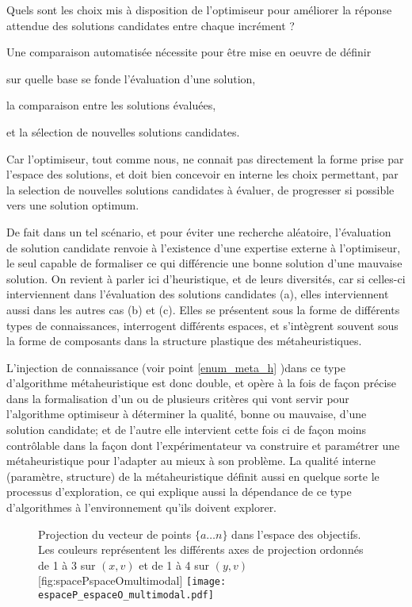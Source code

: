 Quels sont les choix mis à disposition de l'optimiseur pour améliorer la réponse attendue des solutions candidates entre chaque incrément ? \autocite[19]{Weise2011}

Une comparaison automatisée nécessite pour être mise en oeuvre de définir \begin{enumerate*}[label=(\alph*)]
\item sur quelle base se fonde l'évaluation d'une solution,
\item la comparaison entre les solutions évaluées,
\item et la sélection de nouvelles solutions candidates.\end{enumerate*} Car l'optimiseur, tout comme nous, ne connait pas directement la forme prise par l'espace des solutions, et doit bien concevoir en interne les choix permettant, par la selection de nouvelles solutions candidates à évaluer, de progresser si possible vers une solution optimum.

De fait dans un tel scénario, et pour éviter une recherche aléatoire, l'évaluation de solution candidate renvoie à l'existence d'une expertise externe à l'optimiseur, le seul capable de formaliser ce qui différencie une bonne solution d'une mauvaise solution. On revient à parler ici d'heuristique, et de leurs diversités, car si celles-ci interviennent dans l'évaluation des solutions candidates (a), elles interviennent aussi dans les autres cas (b) et (c). Elles se présentent sous la forme de différents types de connaissances, interrogent différents espaces, et s'intègrent souvent sous la forme de composants dans la structure plastique des métaheuristiques.

L'injection de connaissance (voir point \ref{enum_meta_h} )dans ce type d'algorithme métaheuristique est donc double, et opère à la fois de façon précise dans la formalisation d'un ou de plusieurs critères qui vont servir pour l'algorithme optimiseur à déterminer la qualité, bonne ou mauvaise, d'une solution candidate; et de l'autre elle intervient cette fois ci de façon moins contrôlable dans la façon dont l'expérimentateur va construire et paramétrer une métaheuristique pour l'adapter au mieux à son problème. La qualité interne (paramètre, structure) de la métaheuristique définit aussi en quelque sorte le processus d'exploration, ce qui explique aussi la dépendance de ce type d'algorithmes à l'environnement qu'ils doivent explorer.

\begin{figure}[ht]
	\begin{sidecaption}[fortoc]{Projection du vecteur de points $\{a \dotsc n\}$ dans l'espace des objectifs. Les couleurs représentent les différents axes de projection ordonnés de 1 à 3 sur $(x,v)$ et de 1 à 4 sur $(y,v)$}[fig:spacePspaceOmultimodal]
	 \centering
	 	\texttt{[image: espaceP\_espaceO\_multimodal.pdf]}
	\end{sidecaption}
\end{figure}

